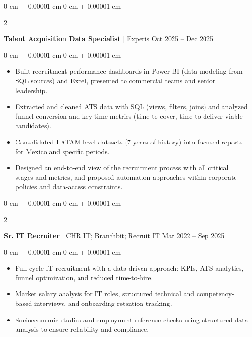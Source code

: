 \documentclass[10pt, a4paper]{article}
\newenvironment{highlights}{
    \begin{itemize}[
        topsep=0.10 cm,
        parsep=0.10 cm,
        partopsep=0pt,
        itemsep=0pt,
        leftmargin=0 cm + 10pt
    ]
}{
    \end{itemize}
} %
\newenvironment{onecolentry}{
    \begin{adjustwidth}{
        0 cm + 0.00001 cm
    }{
        0 cm + 0.00001 cm
    }
}{
    \end{adjustwidth}
} %
\newenvironment{twocolentry}[2][]{
    \onecolentry
    \def\secondColumn{#2}
    \setcolumnwidth{\fill, 4.5 cm}
    \begin{paracol}{2}
}{
    \switchcolumn \raggedleft \secondColumn
    \end{paracol}
    \endonecolentry
} %
\begin{document}
        \vspace{0.2 cm}

    \begin{twocolentry}{
            Oct 2025 -- Dec 2025
        }
        \textbf{Talent Acquisition Data Specialist} | Experis\end{twocolentry}

        \vspace{0.10 cm}
        \begin{onecolentry}
            \begin{highlights}
                \item Built recruitment performance dashboards in Power BI (data modeling from SQL sources) and Excel, presented to commercial teams and senior leadership.
                \item Extracted and cleaned ATS data with SQL (views, filters, joins) and analyzed funnel conversion and key time metrics (time to cover, time to deliver viable candidates).
                \item Consolidated LATAM-level datasets (7 years of history) into focused reports for Mexico and specific periods.
                \item Designed an end-to-end view of the recruitment process with all critical stages and metrics, and proposed automation approaches within corporate policies and data-access constraints.
            \end{highlights}
        \end{onecolentry}

        \vspace{0.2 cm}

    \begin{twocolentry}{
            Mar 2022 -- Sep 2025
        }
        \textbf{Sr. IT Recruiter} | CHR IT; Branchbit; Recruit IT\end{twocolentry}

        \vspace{0.10 cm}
        \begin{onecolentry}
            \begin{highlights}
                \item Full-cycle IT recruitment with a data-driven approach: KPIs, ATS analytics, funnel optimization, and reduced time-to-hire.
                \item Market salary analysis for IT roles, structured technical and competency-based interviews, and onboarding retention tracking.
                \item Socioeconomic studies and employment reference checks using structured data analysis to ensure reliability and compliance.
            \end{highlights}
        \end{onecolentry}
\newpage
\end{document}
